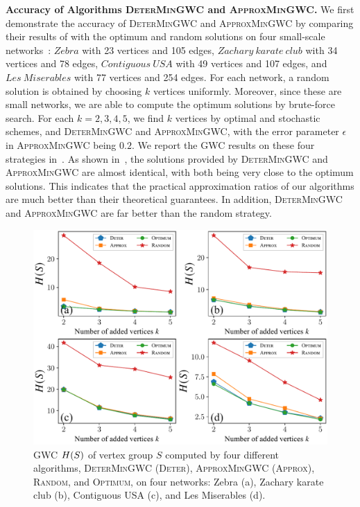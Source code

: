 \documentclass[10pt,twocolumn,twoside]{IEEEtran}
\begin{document}
\textbf{Accuracy of Algorithms \textsc{DeterMinGWC} and \textsc{ApproxMinGWC}.} We first demonstrate the accuracy of \textsc{DeterMinGWC} and \textsc{ApproxMinGWC} by comparing their results of with the optimum and random solutions on four small-scale networks~\cite{Ku13}: \(\mathit{Zebra}\) with 23 vertices and 105 edges, \(\mathit{Zachary\ karate\ club}\) with 34 vertices and 78 edges, \(\mathit{Contiguous\ USA}\) with 49 vertices and 107 edges, and \(\mathit{Les\ Miserables}\) with 77 vertices and 254 edges. For each network, a random solution is obtained by choosing $k$ vertices uniformly. Moreover, since these are small networks, we are able to compute the optimum solutions by brute-force search. For each $k=2,3,4,5$, we find $k$ vertices by optimal and stochastic schemes, and \textsc{DeterMinGWC} and \textsc{ApproxMinGWC}, with the error parameter $\epsilon$ in \textsc{ApproxMinGWC} being  \(0.2\). We report the GWC results on these four strategies in~. As shown in~,  the solutions provided by \textsc{DeterMinGWC} and \textsc{ApproxMinGWC} are almost identical, with both being very close to the optimum solutions. This indicates that the practical approximation ratios of our algorithms are much better than their theoretical guarantees. In addition,  \textsc{DeterMinGWC} and \textsc{ApproxMinGWC} are far better than the random strategy.



\begin{figure}[!t]
    \centering
    \includegraphics[width=\linewidth]{compare_effects_optimum.pdf}
    \caption{GWC \(H(S)\) of vertex group \(S\) computed by four different algorithms, \textsc{DeterMinGWC} (\textsc{Deter}), \textsc{ApproxMinGWC} (\textsc{Approx}), \textsc{Random}, and \textsc{Optimum}, on four networks: Zebra (a), Zachary karate club (b), Contiguous USA (c), and Les Miserables (d).\label{pic:compare-effect-optimum}}
\end{figure}
\end{document}
